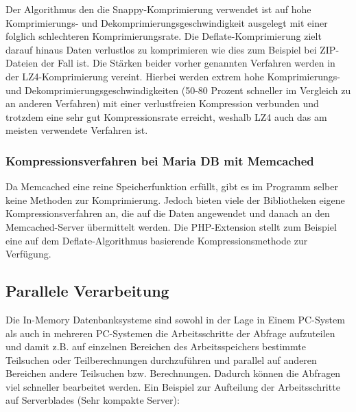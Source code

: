\documentclass[a4paper, 12pt]{scrartcl}
\begin{document}
Der Algorithmus den die Snappy-Komprimierung verwendet ist auf hohe Komprimierungs- und Dekomprimierungsgeschwindigkeit ausgelegt mit einer folglich schlechteren Komprimierungsrate. 
Die Deflate-Komprimierung zielt darauf hinaus Daten verlustlos zu komprimieren wie dies zum Beispiel bei ZIP-Dateien der Fall ist.
Die Stärken beider vorher genannten Verfahren werden in der LZ4-Komprimierung vereint. Hierbei werden extrem hohe Komprimierungs- und Dekomprimierungsgeschwindigkeiten (50-80 Prozent schneller im Vergleich zu an anderen Verfahren) mit einer verlustfreien Kompression verbunden und trotzdem eine sehr gut Kompressionsrate erreicht, weshalb LZ4 auch das am meisten verwendete Verfahren ist.



\subsubsection{Kompressionsverfahren bei Maria DB mit Memcached}
Da Memcached eine reine Speicherfunktion erfüllt, gibt es im Programm selber keine Methoden zur Komprimierung. Jedoch bieten viele der Bibliotheken eigene Kompressionsverfahren an, die auf die Daten angewendet und danach an den Memcached-Server übermittelt werden. Die PHP-Extension stellt zum Beispiel eine auf dem Deflate-Algorithmus basierende Kompressionsmethode zur Verfügung.


\subsection{Parallele Verarbeitung}
Die In-Memory Datenbanksysteme sind sowohl in der Lage in Einem PC-System als auch in mehreren PC-Systemen die Arbeitsschritte der Abfrage aufzuteilen und damit z.B. auf einzelnen Bereichen des Arbeitsspeichers bestimmte Teilsuchen oder Teilberechnungen durchzuführen und parallel auf anderen Bereichen andere Teilsuchen bzw. Berechnungen.
Dadurch können die Abfragen viel schneller bearbeitet werden.
Ein Beispiel zur Aufteilung der Arbeitsschritte auf Serverblades (Sehr kompakte Server):
\end{document}

